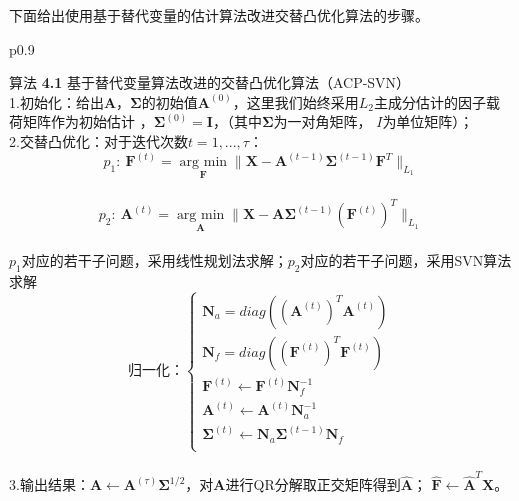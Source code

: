下面给出使用基于替代变量的估计算法改进交替凸优化算法的步骤。
\begin{table}[H]%
    \centering%
    \begin{tabular}{{p{0.9\columnwidth}}}%
    
    \toprule%
    {\heiti 算法} {\bf 4.1} 基于替代变量算法改进的交替凸优化算法（ACP-SVN） \\
    \midrule%
    1.初始化：给出$\bm{A}$，$\bm \Sigma$的初始值$\bm{A}^{(0)}$，这里我们始终采用$L_2$主成分估计的因子载荷矩阵作为初始估计
    ，$\bm \Sigma^{(0)} = \bm I$，（其中$\bm \Sigma$为一对角矩阵，
    $I$为单位矩阵）； \\

    2.交替凸优化：对于迭代次数$t = 1, ..., \tau$： \\
    $$p_1:\ \bm F^{(t)} = \underset{\bm F}{\operatorname{arg\ min}} \|\bm X - \bm{A}^{(t-1)}\bm\Sigma^{(t-1)}
    \bm F^{T}\|_{L_1}$$ \\
    $$p_2:\ \bm{A}^{(t)} = \underset{\bm{A}}{\operatorname{arg\ min}} \|\bm X - \bm{A}\bm\Sigma^{(t-1)}{(\bm F^{(t)})}^T \|_{L_1}$$ \\
    $p_1$对应的若干子问题，采用线性规划法求解；$p_2$对应的若干子问题，采用SVN算法求解\\
    \begin{equation*}
        \text{归一化：}\left\{
                    \begin{array}{clr}
                    \bm N_a = diag({(\bm A^{(t)})}^T\bm{A}^{(t)})\\
                    \bm N_f = diag({(\bm F^{(t)})}^T\bm F^{(t)})\\
                    \bm F^{(t)} \leftarrow \bm F^{(t)}\bm N_f^{-1}\\
                    \bm{A}^{(t)}\leftarrow \bm{A}^{(t)}\bm N_a^{-1}\\
                    \bm \Sigma^{(t)} \leftarrow \bm N_a\bm\Sigma^{(t-1)}\bm N_f\\
                    \end{array}
        \right.
    \end{equation*} \\

    3.输出结果：$\bm{A} \leftarrow \bm{A}^{(\tau)}\bm\Sigma^{1/2}$，对$\bm{A}$进行QR分解取正交矩阵得到$\hat{\bm{A}}$；
    $\hat{\bm{F}} \leftarrow \hat{\bm{A}}^T\bm{X}$。
     \\
    \bottomrule%
    \end{tabular}
\end{table}%

